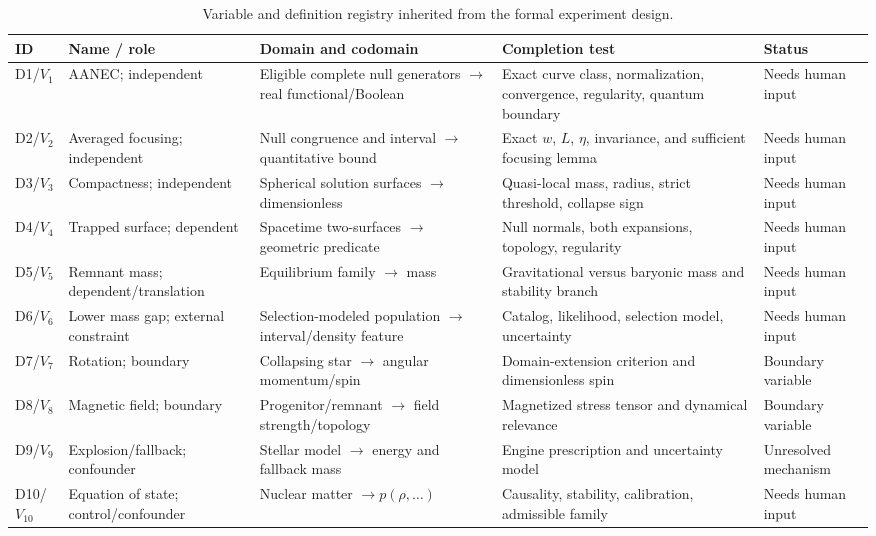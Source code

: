 \documentclass[conference]{IEEEtran}
\begin{document}
\begin{table}[!t]
\caption{Variable and definition registry inherited from the formal experiment design.}
\label{tab:variables}
\centering
\scriptsize
\setlength{\tabcolsep}{3pt}
\begin{tabular}{p{}p{}p{}p{}p{}}
\toprule
\textbf{ID} & \textbf{Name / role} & \textbf{Domain and codomain} & \textbf{Completion test} & \textbf{Status}\\
\midrule
D1/$V_1$ & AANEC; independent & Eligible complete null generators $\rightarrow$ real functional/Boolean & Exact curve class, normalization, convergence, regularity, quantum boundary & Needs human input\\
D2/$V_2$ & Averaged focusing; independent & Null congruence and interval $\rightarrow$ quantitative bound & Exact $w$, $L$, $\eta$, invariance, and sufficient focusing lemma & Needs human input\\
D3/$V_3$ & Compactness; independent & Spherical solution surfaces $\rightarrow$ dimensionless & Quasi-local mass, radius, strict threshold, collapse sign & Needs human input\\
D4/$V_4$ & Trapped surface; dependent & Spacetime two-surfaces $\rightarrow$ geometric predicate & Null normals, both expansions, topology, regularity & Needs human input\\
D5/$V_5$ & Remnant mass; dependent/translation & Equilibrium family $\rightarrow$ mass & Gravitational versus baryonic mass and stability branch & Needs human input\\
D6/$V_6$ & Lower mass gap; external constraint & Selection-modeled population $\rightarrow$ interval/density feature & Catalog, likelihood, selection model, uncertainty & Needs human input\\
D7/$V_7$ & Rotation; boundary & Collapsing star $\rightarrow$ angular momentum/spin & Domain-extension criterion and dimensionless spin & Boundary variable\\
D8/$V_8$ & Magnetic field; boundary & Progenitor/remnant $\rightarrow$ field strength/topology & Magnetized stress tensor and dynamical relevance & Boundary variable\\
D9/$V_9$ & Explosion/fallback; confounder & Stellar model $\rightarrow$ energy and fallback mass & Engine prescription and uncertainty model & Unresolved mechanism\\
D10/$V_{10}$ & Equation of state; control/confounder & Nuclear matter $\rightarrow p(\rho,\ldots)$ & Causality, stability, calibration, admissible family & Needs human input\\
\bottomrule
\end{tabular}
\end{table}
\end{document}
